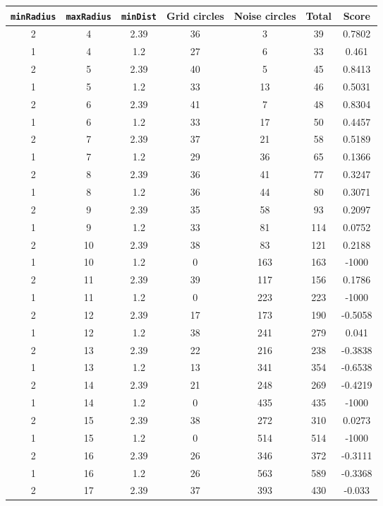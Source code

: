 \documentclass[letterpaper, 12pt]{article}
\begin{document}
\begin{longtable}{|c|c|c|c|c|c|c|}
\hline
\textbf{\texttt{minRadius}} & \textbf{\texttt{maxRadius}} & \textbf{\texttt{minDist}} & \textbf{Grid circles} & \textbf{Noise circles} & \textbf{Total} & \textbf{Score} \\
\hline
2 & 4 & 2.39 & 36 & 3 & 39 & 0.7802 \\
\hline
1 & 4 & 1.2 & 27 & 6 & 33 & 0.461 \\
\hline
2 & 5 & 2.39 & 40 & 5 & 45 & 0.8413 \\
\hline
1 & 5 & 1.2 & 33 & 13 & 46 & 0.5031 \\
\hline
2 & 6 & 2.39 & 41 & 7 & 48 & 0.8304 \\
\hline
1 & 6 & 1.2 & 33 & 17 & 50 & 0.4457 \\
\hline
2 & 7 & 2.39 & 37 & 21 & 58 & 0.5189 \\
\hline
1 & 7 & 1.2 & 29 & 36 & 65 & 0.1366 \\
\hline
2 & 8 & 2.39 & 36 & 41 & 77 & 0.3247 \\
\hline
1 & 8 & 1.2 & 36 & 44 & 80 & 0.3071 \\
\hline
2 & 9 & 2.39 & 35 & 58 & 93 & 0.2097 \\
\hline
1 & 9 & 1.2 & 33 & 81 & 114 & 0.0752 \\
\hline
2 & 10 & 2.39 & 38 & 83 & 121 & 0.2188 \\
\hline
1 & 10 & 1.2 & 0 & 163 & 163 & -1000 \\
\hline
2 & 11 & 2.39 & 39 & 117 & 156 & 0.1786 \\
\hline
1 & 11 & 1.2 & 0 & 223 & 223 & -1000 \\
\hline
2 & 12 & 2.39 & 17 & 173 & 190 & -0.5058 \\
\hline
1 & 12 & 1.2 & 38 & 241 & 279 & 0.041 \\
\hline
2 & 13 & 2.39 & 22 & 216 & 238 & -0.3838 \\
\hline
1 & 13 & 1.2 & 13 & 341 & 354 & -0.6538 \\
\hline
2 & 14 & 2.39 & 21 & 248 & 269 & -0.4219 \\
\hline
1 & 14 & 1.2 & 0 & 435 & 435 & -1000 \\
\hline
2 & 15 & 2.39 & 38 & 272 & 310 & 0.0273 \\
\hline
1 & 15 & 1.2 & 0 & 514 & 514 & -1000 \\
\hline
2 & 16 & 2.39 & 26 & 346 & 372 & -0.3111 \\
\hline
1 & 16 & 1.2 & 26 & 563 & 589 & -0.3368 \\
\hline
2 & 17 & 2.39 & 37 & 393 & 430 & -0.033 \\

\end{longtable}
\end{document}
